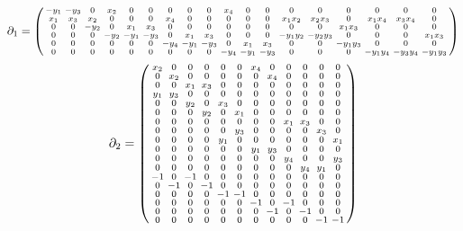 \documentclass{amsart}
\theoremstyle{remark}
\begin{document}
  \[
  \partial_1=\begin{psmallmatrix}
    -y_1 & -y_3 & 0 & x_2 & 0 & 0 & 0 & 0 & 0 & x_4 & 0 & 0 & 0 & 0 & 0 & 0 & 0 & 0\\
    x_1 & x_3 & x_2 & 0 & 0 & 0 & x_4 & 0 & 0 & 0 & 0 & 0 & x_1x_2 & x_2x_3 & 0 & x_1x_4 & x_3x_4 & 0\\
    0 & 0 & -y_2 & 0 & x_1 & x_3 & 0 & 0 & 0 & 0 & 0 & 0 & 0 & 0 & x_1x_3 & 0 & 0 & 0\\
    0 & 0 & 0 & -y_2 & -y_1 & -y_3 & 0 & x_1 & x_3 & 0 & 0 & 0 & -y_1y_2 & -y_2y_3 & 0 & 0 & 0 & x_1x_3\\
    0 & 0 & 0 & 0 & 0 & 0 & -y_4 & -y_1 & -y_3 & 0 & x_1 & x_3 & 0 & 0 & -y_1y_3 & 0 & 0 & 0\\
    0 & 0 & 0 & 0 & 0 & 0 & 0 & 0 & 0 & -y_4 & -y_1 & -y_3 & 0 & 0 & 0 & -y_1y_4 & -y_3y_4 & -y_1y_3\\
  \end{psmallmatrix}
  \]
    \[
    \partial_2=\begin{psmallmatrix}
    x_2 & 0 & 0 & 0 & 0 & 0 & x_4 & 0 & 0 & 0 & 0 & 0\\ %
    0 & x_2 & 0 & 0 & 0 & 0 & 0 & x_4 & 0 & 0 & 0 & 0\\ %
    0 & 0 & x_1 & x_3 & 0 & 0 & 0 & 0 & 0 & 0 & 0 & 0\\ %
    y_1 & y_3 & 0 & 0 & 0 & 0 & 0 & 0 & 0 & 0 & 0 & 0\\ %
    0 & 0 & y_2 & 0 & x_3 & 0 & 0 & 0 & 0 & 0 & 0 & 0\\ %
    0 & 0 & 0 & y_2 & 0 & x_1 & 0 & 0 & 0 & 0 & 0 & 0\\ %
    0 & 0 & 0 & 0 & 0 & 0 & 0 & 0 & x_1 & x_3 & 0 & 0\\ %
    0 & 0 & 0 & 0 & 0 & y_3 & 0 & 0 & 0 & 0 & x_3 & 0\\ %
    0 & 0 & 0 & 0 & y_1 & 0 & 0 & 0 & 0 & 0 & 0 & x_1\\ %
    0 & 0 & 0 & 0 & 0 & 0 & y_1 & y_3 & 0 & 0 & 0 & 0\\ %
    0 & 0 & 0 & 0 & 0 & 0 & 0 & 0 & y_4 & 0 & 0 & y_3\\ %
    0 & 0 & 0 & 0 & 0 & 0 & 0 & 0 & 0 & y_4 & y_1 & 0 \\ %
    -1 & 0 & -1 & 0 & 0 & 0 & 0 & 0 & 0 & 0 & 0 & 0\\ %
    0 & -1 & 0 & -1 & 0 & 0 & 0 & 0 & 0 & 0 & 0 & 0\\ %
    0 & 0 & 0 & 0 & -1 & -1 & 0 & 0 & 0 & 0 & 0 & 0\\ %
    0 & 0 & 0 & 0 & 0 & 0 & -1 & 0 & -1 & 0 & 0 & 0\\ %
    0 & 0 & 0 & 0 & 0 & 0 & 0 & -1 & 0 & -1 & 0 & 0\\ %
    0 & 0 & 0 & 0 & 0 & 0 & 0 & 0 & 0 & 0 & -1 & -1\\ %
  \end{psmallmatrix}
  \]
\end{document}
